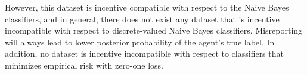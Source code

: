 \documentclass{article}
\begin{document}
\newline \newline
However, this dataset is incentive compatible with respect to the Naive Bayes classifiers, and in general, there does not exist any dataset that is incentive incompatible with respect to discrete-valued Naive Bayes classifiers. Misreporting will always lead to lower posterior probability of the agent's true label. In addition, no dataset is incentive incompatible with respect to classifiers that minimizes empirical risk with zero-one loss.
\newline \newline
\end{document}
